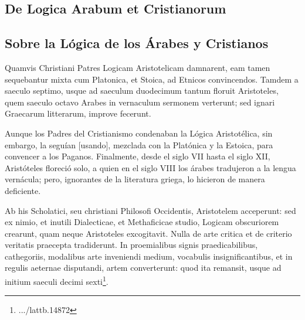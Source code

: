 \documentclass{article}
\begin{document}
\begin{paracol}{2}
\begin{nthcolumn}{1}
\end{nthcolumn}
\vspace{0.5cm}
\begin{nthcolumn*}{0} %
  \subsection*{\centering De Logica Arabum et Cristianorum}
\end{nthcolumn*}
\vspace{0.5cm}
\begin{nthcolumn}{1} %
  \subsection*{\centering Sobre la Lógica de los Árabes y Cristianos}
\end{nthcolumn}
\vspace{0.5cm}
\begin{nthcolumn*}{0} %
  Quamvis Christiani Patres Logicam Aristotelicam damnarent, eam tamen sequebantur mixta cum Platonica, et Stoica, ad Etnicos convincendos. Tamdem a saeculo septimo, usque ad saeculum duodecimum tantum floruit Aristoteles, quem saeculo octavo Arabes in vernaculum sermonem verterunt; sed ignari Graecarum litterarum, improve fecerunt.
\end{nthcolumn*}
\vspace{0.5cm}
\begin{nthcolumn}{1} %
  Aunque los Padres del Cristianismo condenaban la Lógica Aristotélica, sin embargo, la seguían [usando], mezclada con la Platónica y la Estoica, para convencer a los Paganos. Finalmente, desde el siglo VII hasta el siglo XII, Aristóteles floreció solo, a quien en el siglo VIII los árabes tradujeron a la lengua vernácula; pero, ignorantes de la literatura griega, lo hicieron de manera deficiente.
\end{nthcolumn}
\vspace{0.5cm}
\begin{nthcolumn*}{0} %
  Ab his Scholatici, seu christiani Philosofi Occidentis, Aristotelem acceperunt: sed ex nimio, et inutili Dialecticae, et Methaficicae studio, Logicam obscuriorem crearunt, quam neque Aristoteles excogitavit. Nulla de arte critica et de criterio veritatis praecepta tradiderunt. In proemialibus signis praedicabilibus, cathegoriis, modalibus arte inveniendi medium, vocabulis insignificantibus, et in regulis aeternae disputandi, artem converterunt: quod ita remansit, usque ad initium saeculi decimi sexti\footnote{.../lattb.14872}.

\end{nthcolumn*}
\end{paracol}
\end{document}
